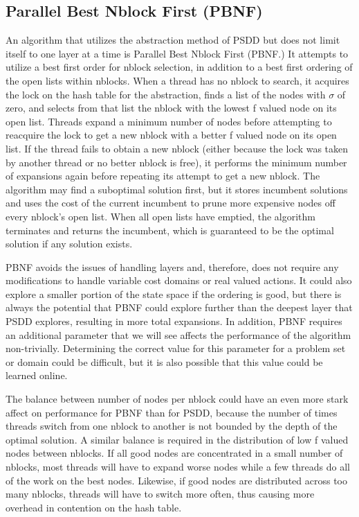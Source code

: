 \documentclass{article}
\begin{document}
\subsection{Parallel Best Nblock First (PBNF)}
An algorithm that utilizes the abstraction method of PSDD but does not limit itself to one layer at a time is Parallel Best Nblock First (PBNF.) It attempts to utilize a best first order for nblock selection, in addition to a best first ordering of the open lists within nblocks. When a thread has no nblock to search, it acquires the lock on the hash table for the abstraction, finds a list of the nodes with $\sigma$ of zero, and selects from that list the nblock with the lowest f valued node on its open list. Threads expand a minimum number of nodes before attempting to reacquire the lock to get a new nblock with a better f valued node on its open list. If the thread fails to obtain a new nblock (either because the lock was taken by another thread or no better nblock is free), it performs the minimum number of expansions again before repeating its attempt to get a new nblock. The algorithm may find a suboptimal solution first, but it stores incumbent solutions and uses the cost of the current incumbent to prune more expensive nodes off every nblock's open list. When all open lists have emptied, the algorithm terminates and returns the incumbent, which is guaranteed to be the optimal solution if any solution exists.

PBNF avoids the issues of handling layers and, therefore, does not require any modifications to handle variable cost domains or real valued actions. It could also explore a smaller portion of the state space if the ordering is good, but there is always the potential that PBNF could explore further than the deepest layer that PSDD explores, resulting in more total expansions. In addition, PBNF requires an additional parameter that we will see affects the performance of the algorithm non-trivially. Determining the correct value for this parameter for a problem set or domain could be difficult, but it is also possible that this value could be learned online.

The balance between number of nodes per nblock could have an even more stark affect on performance for PBNF than for PSDD, because the number of times threads switch from one nblock to another is not bounded by the depth of the optimal solution. A similar balance is required in the distribution of low f valued nodes between nblocks. If all good nodes are concentrated in a small number of nblocks, most threads will have to expand worse nodes while a few threads do all of the work on the best nodes. Likewise, if good nodes are distributed across too many nblocks, threads will have to switch more often, thus causing more overhead in contention on the hash table.
\end{document}
